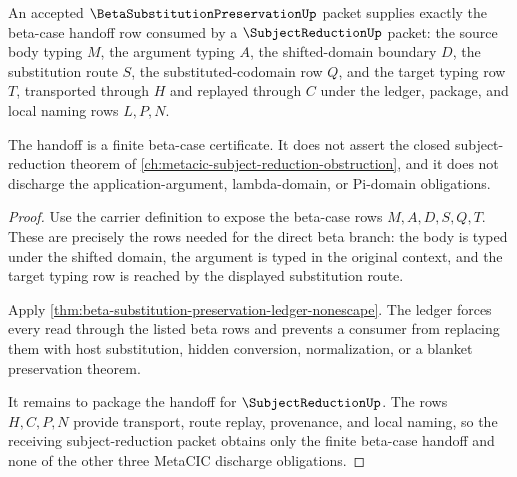 \begin{theorem}
\label{thm:beta-substitution-preservation-subject-reduction-handoff}
An accepted $\BetaSubstitutionPreservationUp$ packet supplies exactly the beta-case handoff row consumed by a $\SubjectReductionUp$ packet: the source body typing $M$, the argument typing $A$, the shifted-domain boundary $D$, the substitution route $S$, the substituted-codomain row $Q$, and the target typing row $T$, transported through $H$ and replayed through $C$ under the ledger, package, and local naming rows $L,P,N$.

The handoff is a finite beta-case certificate. It does not assert the closed subject-reduction theorem of \autoref{ch:metacic-subject-reduction-obstruction}, and it does not discharge the application-argument, lambda-domain, or Pi-domain obligations.
\end{theorem}
\begin{proof}
Use the carrier definition to expose the beta-case rows $M,A,D,S,Q,T$. These are precisely the rows needed for the direct beta branch: the body is typed under the shifted domain, the argument is typed in the original context, and the target typing row is reached by the displayed substitution route.

Apply \autoref{thm:beta-substitution-preservation-ledger-nonescape}. The ledger forces every read through the listed beta rows and prevents a consumer from replacing them with host substitution, hidden conversion, normalization, or a blanket preservation theorem.

It remains to package the handoff for $\SubjectReductionUp$. The rows $H,C,P,N$ provide transport, route replay, provenance, and local naming, so the receiving subject-reduction packet obtains only the finite beta-case handoff and none of the other three MetaCIC discharge obligations.
\end{proof}
